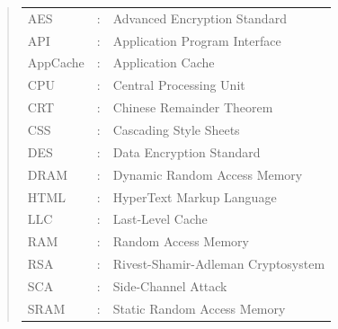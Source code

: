 \documentclass[10pt,a4paper,twoside]{book}
\begin{document}

\begin{quote}
\noindent
\begin{tabular}{lcl}

AES			   	 	&:	   & Advanced Encryption Standard							 \\	
API					&:     & Application Program Interface							 \\
AppCache		   	 	&:	   & Application Cache   									 \\	
CPU					&:	   & Central Processing Unit									 \\
CRT					&:	   & Chinese Remainder Theorem								 \\
CSS					&:	   & Cascading Style Sheets									 \\
DES					&:	   & Data Encryption Standard								 \\
DRAM					&:	   & Dynamic Random Access Memory							 \\
HTML					&:     & HyperText Markup Language								 \\
LLC					&:	   & Last-Level Cache										 \\
RAM					&:	   & Random Access Memory									 \\
RSA					&:	   & Rivest-Shamir-Adleman Cryptosystem				    		 \\
SCA					&:	   & Side-Channel Attack										 \\	
SRAM					&:	   & Static Random Access Memory								 \\
\end{tabular}
\end{quote}
\end{document}
